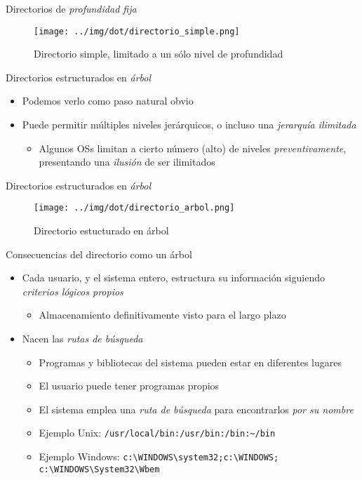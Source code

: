 \documentclass[presentation]{beamer}
\begin{document}
\begin{frame}[label={sec:orga78b63d}]{Directorios de \emph{profundidad fija}}
\begin{figure}[htbp]
\centering
\texttt{[image: ../img/dot/directorio\_simple.png]}
\caption{Directorio simple, limitado a un sólo nivel de profundidad}
\end{figure}
\end{frame}

\begin{frame}[label={sec:org73abaf7}]{Directorios estructurados en \emph{árbol}}
\begin{itemize}
\item Podemos verlo como paso natural obvio
\item Puede permitir múltiples niveles jerárquicos, o incluso una
\emph{jerarquía ilimitada}
\begin{itemize}
\item Algunos OSs limitan a cierto número (alto) de niveles
\emph{preventivamente}, presentando una \emph{ilusión} de ser ilimitados
\end{itemize}
\end{itemize}
\end{frame}

\begin{frame}[label={sec:org03d069e}]{Directorios estructurados en \emph{árbol}}
\begin{figure}[htbp]
\centering
\texttt{[image: ../img/dot/directorio\_arbol.png]}
\caption{Directorio estucturado en árbol}
\end{figure}
\end{frame}

\begin{frame}[label={sec:orge5266ed},fragile]{Consecuencias del directorio como un árbol}
 \begin{itemize}
\item Cada usuario, y el sistema entero, estructura su información
siguiendo \emph{criterios lógicos propios}
\begin{itemize}
\item Almacenamiento definitivamente visto para el largo plazo
\end{itemize}
\item Nacen las \emph{rutas de búsqueda}
\begin{itemize}
\item Programas y bibliotecas del sistema pueden estar en diferentes lugares
\item El usuario puede tener programas propios
\item El sistema emplea una \emph{ruta de búsqueda} para encontrarlos \emph{por su
nombre}
\item Ejemplo Unix: \texttt{/usr/local/bin:/usr/bin:/bin:\textasciitilde{}/bin}
\item Ejemplo Windows: \texttt{c:\textbackslash{}WINDOWS\textbackslash{}system32;c:\textbackslash{}WINDOWS;}
\texttt{c:\textbackslash{}WINDOWS\textbackslash{}System32\textbackslash{}Wbem}
\end{itemize}
\end{itemize}
\end{frame}
\end{document}
